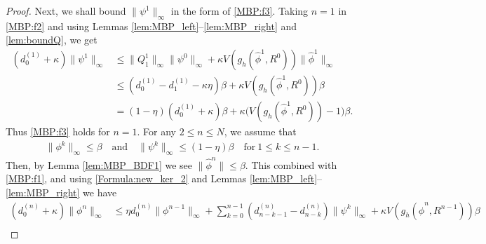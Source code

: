 \documentclass{m2an}
\begin{document}
\begin{proof}
	Next, we shall bound $ \| \psi^{1} \|_{\infty} $ in the form of \eqref{MBP:f3}. Taking $ n = 1 $ in \eqref{MBP:f2} and using Lemmas \ref{lem:MBP_left}--\ref{lem:MBP_right} and \ref{lem:boundQ}, we get
	\begin{equation*}
		\begin{aligned}
			( d^{(1)}_{0} + \kappa ) \| \psi^{1} \|_{\infty} & \leq  \| Q^{1}_{1} \|_{\infty} \| \psi^{0} \|_{\infty} + \kappa V( g_h(\hat{\phi}^{1}, R^{0}) ) \| \hat{\phi}^{1} \|_{\infty} \\
			& \leq ( d_{0}^{(1)}-d_1^{(1)} - \kappa \eta ) \beta + \kappa V( g_h(\hat{\phi}^{1}, R^{0}) ) \beta\\
			& = ( 1 - \eta ) ( d^{(1)}_{0} + \kappa ) \beta + \kappa \big( V( g_h(\hat{\phi}^{1}, R^{0}) ) - 1 \big) \beta.
		\end{aligned}
	\end{equation*}
	Thus \eqref{MBP:f3} holds for $ n = 1 $.
	For any $ 2 \leq n \leq N $, we assume that
	\begin{equation}\label{MBP:f4}
		\begin{aligned}
			\| \phi^{k} \|_{ \infty } \leq \beta \quad \text{and} \quad \| \psi^{k} \|_{ \infty } \leq ( 1 - \eta ) \beta \quad \text{for} \  1 \leq k \leq n-1.
		\end{aligned}
	\end{equation}
	Then, by Lemma \ref{lem:MBP_BDF1} we see $ \|\hat{\phi}^{n}\| \leq \beta $. This combined with \eqref{MBP:f1}, and using \eqref{Formula:new_ker_2} and  Lemmas \ref{lem:MBP_left}--\ref{lem:MBP_right} we have
	\begin{equation}\label{MBP:f5}
		\begin{aligned}
			( d^{(n)}_{0} + \kappa ) \| \phi^n \|_{\infty} %
			& \leq \eta d^{(n)}_{0} \| \phi^{n-1} \|_{\infty} + \sum^{n-1}_{k=0} ( d^{(n)}_{n-k-1} - d^{(n)}_{n-k} ) \| \psi^{k} \|_{\infty}+ \kappa V( g_h(\hat{\phi}^{n}, R^{n-1}) ) \beta \\

\end{aligned}
\end{equation}
\end{proof}
\end{document}
